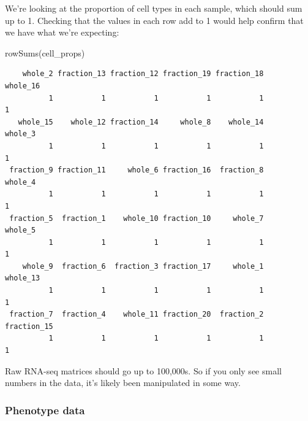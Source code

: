 \documentclass[
  letterpaper,
  DIV=11,
  numbers=noendperiod]{scrreprt}
\newenvironment{Shaded}{\begin{snugshade}}{\end{snugshade}}
\newcommand{\FunctionTok}[1]{\textcolor[rgb]{0.28,0.35,0.67}{#1}}
\newcommand{\NormalTok}[1]{\textcolor[rgb]{0.00,0.23,0.31}{#1}}
\begin{document}
We're looking at the proportion of cell types in each sample, which
should sum up to 1. Checking that the values in each row add to 1 would
help confirm that we have what we're expecting:

\begin{Shaded}
\begin{Highlighting}[]
\FunctionTok{rowSums}\NormalTok{(cell\_props)}
\end{Highlighting}
\end{Shaded}

\begin{verbatim}
    whole_2 fraction_13 fraction_12 fraction_19 fraction_18    whole_16 
          1           1           1           1           1           1 
   whole_15    whole_12 fraction_14     whole_8    whole_14     whole_3 
          1           1           1           1           1           1 
 fraction_9 fraction_11     whole_6 fraction_16  fraction_8     whole_4 
          1           1           1           1           1           1 
 fraction_5  fraction_1    whole_10 fraction_10     whole_7     whole_5 
          1           1           1           1           1           1 
    whole_9  fraction_6  fraction_3 fraction_17     whole_1    whole_13 
          1           1           1           1           1           1 
 fraction_7  fraction_4    whole_11 fraction_20  fraction_2 fraction_15 
          1           1           1           1           1           1 
\end{verbatim}

\begin{tcolorbox}[enhanced jigsaw, bottomtitle=1mm, bottomrule=.15mm, toprule=.15mm, opacityback=0, leftrule=.75mm, breakable, colback=white, toptitle=1mm, left=2mm, coltitle=black, titlerule=0mm, opacitybacktitle=0.6, title=\textcolor{quarto-callout-tip-color}{\faLightbulb}\hspace{0.5em}{Tip}, rightrule=.15mm, arc=.35mm, colframe=quarto-callout-tip-color-frame, colbacktitle=quarto-callout-tip-color!10!white]

Raw RNA-seq matrices should go up to 100,000s. So if you only see small
numbers in the data, it's likely been manipulated in some way.

\end{tcolorbox}

\subsubsection{Phenotype data}\label{phenotype-data}
\end{document}
